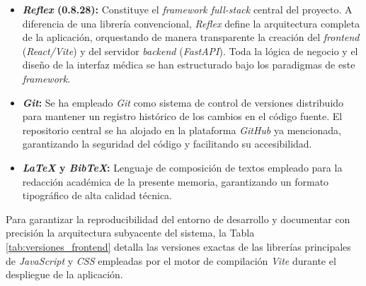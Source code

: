 \begin{itemize}
    \item \textbf{\textit{Reflex} (0.8.28):} Constituye el \textit{framework full-stack} central del proyecto. A diferencia de una librería convencional, \textit{Reflex} define la arquitectura completa de la aplicación, orquestando de manera transparente la creación del \textit{frontend} (\textit{React/Vite}) y del servidor \textit{backend} (\textit{FastAPI}). Toda la lógica de negocio y el diseño de la interfaz médica se han estructurado bajo los paradigmas de este \textit{framework}. \cite{reflex}
    
    \item \textbf{\textit{Git}:} Se ha empleado \textit{Git} como sistema de control de versiones distribuido para mantener un registro histórico de los cambios en el código fuente. El repositorio central se ha alojado en la plataforma \textit{GitHub} ya mencionada, garantizando la seguridad del código y facilitando su accesibilidad. \cite{git}

    \item \textbf{\textit{LaTeX} y \textit{BibTeX}:} Lenguaje de composición de textos empleado para la redacción académica de la presente memoria, garantizando un formato tipográfico de alta calidad técnica. \cite{latex}
\end{itemize}

Para garantizar la reproducibilidad del entorno de desarrollo y documentar con precisión la arquitectura subyacente del sistema, la Tabla \ref{tab:versiones_frontend} detalla las versiones exactas de las librerías principales de \textit{JavaScript} y \textit{CSS} empleadas por el motor de compilación \textit{Vite} \cite{vite} durante el despliegue de la aplicación. 

